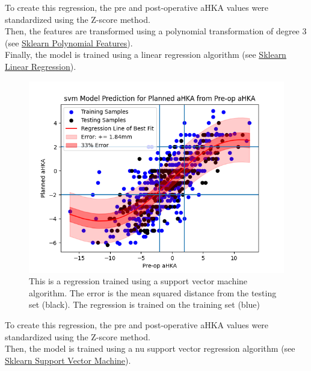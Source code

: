 \documentclass{article}
\begin{document}
To create this regression, the pre and post-operative aHKA values were standardized using the Z-score method.\\
Then, the features are transformed using a polynomial transformation of degree 3 
(see \href{https://scikit-learn.org/stable/modules/generated/sklearn.linear_model.LinearRegression.html}{\underline{Sklearn Polynomial Features}}).\\
Finally, the model is trained using a linear regression algorithm 
(see \href{https://scikit-learn.org/stable/modules/generated/sklearn.linear_model.LinearRegression.html}{\underline{Sklearn Linear Regression}}).

\newpage

\begin{figure}[t]
	\includegraphics[width=\textwidth]{svm_regression.png}
	\caption{This is a regression trained using a support vector machine algorithm.
	The error is the mean squared distance from the testing set (black). 
	The regression is trained on the training set (blue)}
\end{figure}

To create this regression, the pre and post-operative aHKA values were standardized using the Z-score method.\\
Then, the model is trained using a nu support vector regression algorithm
(see \href{https://scikit-learn.org/stable/modules/generated/sklearn.svm.NuSVR.html#sklearn.svm.NuSVR}{\underline{Sklearn Support Vector Machine}}).

\newpage
\end{document}
